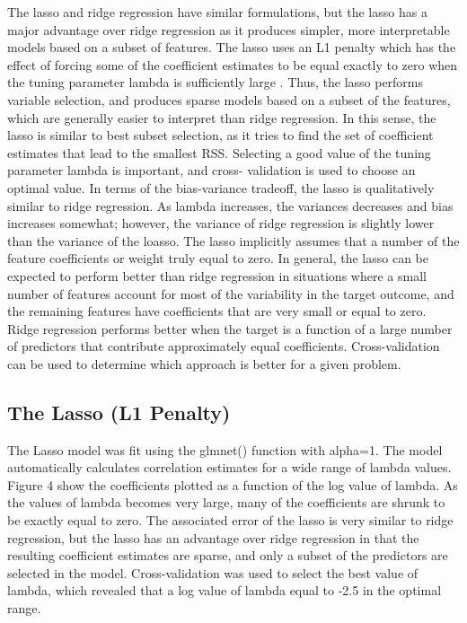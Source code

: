 \documentclass[sigconf]{acmart}
\begin{document}
The lasso and ridge regression have similar formulations, but the lasso has a 
major advantage over ridge regression as it produces simpler, more interpretable
models based on a subset of features. The lasso uses an L1 penalty which has the 
effect of forcing some of the coefficient estimates to be equal exactly to zero 
when the tuning parameter lambda is sufficiently large \cite{statlearn13}. Thus, 
the lasso performs variable selection, and produces sparse models based on a 
subset of the features, which are generally easier to interpret than ridge 
regression. In this sense, the lasso is similar to best subset selection, as it
tries to find the set of coefficient estimates that lead to the smallest RSS. 
Selecting a good value of the tuning parameter lambda is important, and cross-
validation is used to choose an optimal value. In terms of the bias-variance
tradeoff, the lasso is qualitatively similar to ridge regression. As lambda
increases, the variances decreases and bias increases somewhat; however, the
variance of ridge regression is slightly lower than the variance of the loasso.
The lasso implicitly assumes that a number of the feature coefficients or
weight truly equal to zero. In general, the lasso can be expected to perform
better than ridge regression in situations where a small number of features
account for most of the variability in the target outcome, and the remaining
features have coefficients that are very small or equal to zero. Ridge 
regression performs better when the target is a function of a large number of 
predictors that contribute approximately equal coefficients. Cross-validation
can be used to determine which approach is better for a given problem. 



\subsection{The Lasso (L1 Penalty)}

The Lasso model was fit using the glmnet() function with alpha=1. The model
automatically calculates correlation estimates for a wide range of lambda
values. Figure 4 show the coefficients plotted as a function of the log
value of lambda. As the values of lambda becomes very large, many of the 
coefficients are shrunk to be exactly equal to zero. The associated error 
of the lasso is very similar to ridge regression, but the lasso has an 
advantage over ridge regression in that the resulting coefficient estimates 
are sparse, and only a subset of the predictors are selected in the model. 
Cross-validation was used to select the best value of lambda, which 
revealed that a log value of lambda equal to -2.5 in the optimal range.
\end{document}
